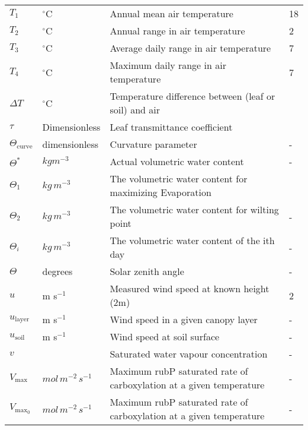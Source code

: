 \documentclass[10pt]{article}
\begin{document}
\begin{center}
\begin{longtable}{l l p{3in} p{0.5in}}
$T_1$	&	$^\circ$C	&	Annual mean air temperature	&	18	\\
$T_2$	&	$^\circ$C	&	Annual range in air temperature	&	2	\\
$T_3$	&	$^\circ$C	&	Average daily range in air temperature	&	7	\\
$T_4$	&	$^\circ$C	&	Maximum daily range in air temperature	&	7	\\
$\Delta T$ &	$^\circ$C& Temperature difference between (leaf or soil) and air &\\
$\tau$	&	Dimensionless 	&	Leaf transmittance coefficient	&		\\
$\Theta_{\text{curve}}$	&	dimensionless	&	Curvature parameter	&	-	\\
$\Theta^{*}$	&	$kg m^{-3}$	&	Actual volumetric water content	&	-	\\
$\Theta_1$	&	$kg\, m^{-3}$	&	The volumetric water content for maximizing Evaporation	&		\\
$\Theta_2$	&	$kg\, m^{-3}$	&	The volumetric water content for wilting point	&	-	\\
$\Theta_i$	&	$kg\, m^{-3}$	&	The volumetric water content of the ith day	&	-	\\
$\Theta$	&	degrees	&	Solar zenith angle	&	-	\\
$u$	&	m s$^{-1}$	&	Measured wind speed at known height (2m)	&	2	\\
$u_{\text{layer}}$	&	m s$^{-1}$ 	&	Wind speed in a given canopy layer	&	-	\\
$u_{\text{soil}}$	&	m s$^{-1}$ 	&	Wind speed at soil surface	&	-	\\
$v$	&		&	Saturated water vapour concentration 	&	-	\\
$V_{\text{max}}$	&	$mol\, m^{-2}\, s^{-1}$ 	&	Maximum rubP saturated rate of carboxylation at a given temperature	&	-	\\
$V_{\text{max}_0}$	&	$mol\, m^{-2}\, s^{-1}$ 	&	Maximum rubP saturated rate of carboxylation at a given temperature	&	-	\\


\end{longtable}
\end{center}
\end{document}
